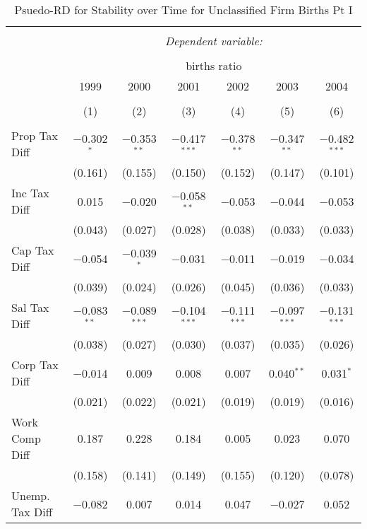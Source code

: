 
\begin{table}[!htbp] \centering 
  \caption{Psuedo-RD for Stability over Time for  Unclassified Firm Births Pt I} 
  \label{99year} 
\small 
\begin{tabular}{@{\extracolsep{5pt}}lcccccc} 
\\[-1.8ex]\hline 
\hline \\[-1.8ex] 
 & \multicolumn{6}{c}{\textit{Dependent variable:}} \\ 
\cline{2-7} 
\\[-1.8ex] & \multicolumn{6}{c}{births ratio} \\ 
 & 1999 & 2000 & 2001 & 2002 & 2003 & 2004 \\ 
\\[-1.8ex] & (1) & (2) & (3) & (4) & (5) & (6)\\ 
\hline \\[-1.8ex] 
 Prop Tax Diff & $-$0.302$^{*}$ & $-$0.353$^{**}$ & $-$0.417$^{***}$ & $-$0.378$^{**}$ & $-$0.347$^{**}$ & $-$0.482$^{***}$ \\ 
  & (0.161) & (0.155) & (0.150) & (0.152) & (0.147) & (0.101) \\ 
  Inc Tax Diff & 0.015 & $-$0.020 & $-$0.058$^{**}$ & $-$0.053 & $-$0.044 & $-$0.053 \\ 
  & (0.043) & (0.027) & (0.028) & (0.038) & (0.033) & (0.033) \\ 
  Cap Tax Diff & $-$0.054 & $-$0.039$^{*}$ & $-$0.031 & $-$0.011 & $-$0.019 & $-$0.034 \\ 
  & (0.039) & (0.024) & (0.026) & (0.045) & (0.036) & (0.033) \\ 
  Sal Tax Diff & $-$0.083$^{**}$ & $-$0.089$^{***}$ & $-$0.104$^{***}$ & $-$0.111$^{***}$ & $-$0.097$^{***}$ & $-$0.131$^{***}$ \\ 
  & (0.038) & (0.027) & (0.030) & (0.037) & (0.035) & (0.026) \\ 
  Corp Tax Diff & $-$0.014 & 0.009 & 0.008 & 0.007 & 0.040$^{**}$ & 0.031$^{*}$ \\ 
  & (0.021) & (0.022) & (0.021) & (0.019) & (0.019) & (0.016) \\ 
  Work Comp Diff & 0.187 & 0.228 & 0.184 & 0.005 & 0.023 & 0.070 \\ 
  & (0.158) & (0.141) & (0.149) & (0.155) & (0.120) & (0.078) \\ 
  Unemp. Tax Diff & $-$0.082 & 0.007 & 0.014 & 0.047 & $-$0.027 & 0.052 \\ 

\end{tabular}
\end{table}

